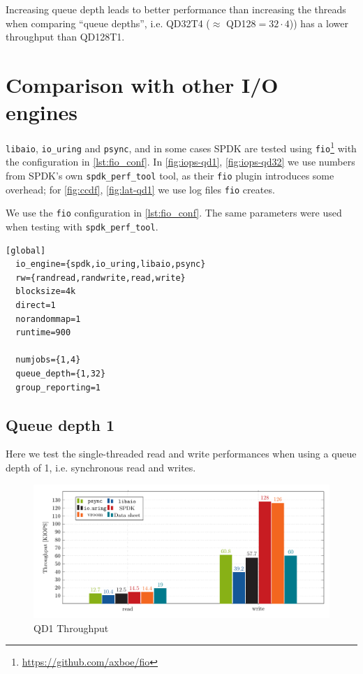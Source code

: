 Increasing queue depth leads to better performance than increasing the threads when comparing ``queue depths'', i.e. QD32T4 ($\approx$ QD128$=32 \cdot 4$)) has a lower throughput than QD128T1.



\section{Comparison with other I/O engines}
\texttt{libaio}, \texttt{io\_uring} and \texttt{psync}, and in some cases SPDK are tested using \texttt{fio}\footnote{\url{https://github.com/axboe/fio}} with the configuration in \autoref{lst:fio_conf}. In \autoref{fig:iops-qd1}, \autoref{fig:iops-qd32} we use numbers from SPDK's own \texttt{spdk\_perf\_tool} tool, as their \texttt{fio} plugin introduces some overhead; for \autoref{fig:ccdf}, \autoref{fig:lat-qd1} we use log files \texttt{fio} creates.

We use the \texttt{fio} configuration in \autoref{lst:fio_conf}. The same parameters were used when testing with \texttt{spdk\_perf\_tool}.

\begin{lstlisting}[float, label=lst:fio_conf, caption=\texttt{fio} configuration]
  [global]
  io_engine={spdk,io_uring,libaio,psync}
  rw={randread,randwrite,read,write}
  blocksize=4k
  direct=1
  norandommap=1
  runtime=900

  numjobs={1,4}
  queue_depth={1,32}
  group_reporting=1
\end{lstlisting}

\subsection{Queue depth 1}
Here we test the single-threaded read and write performances when using a queue depth of 1, i.e. synchronous read and writes.

\begin{figure}[H]
  \centering
    \includegraphics[width=\textwidth]{figures/iops-qd1-ybar}
    \caption{QD1 Throughput}
    \label{fig:iops-qd1}
\end{figure}

